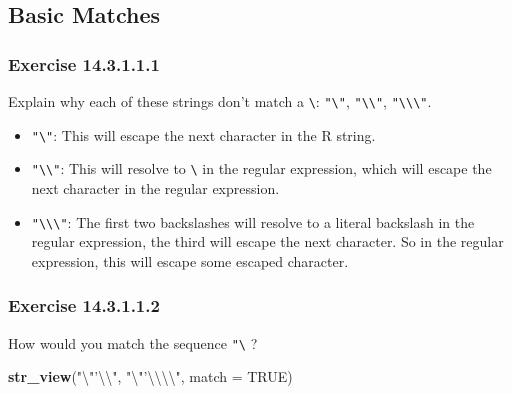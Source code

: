 \documentclass[]{book}
\newenvironment{Shaded}{\begin{snugshade}}{\end{snugshade}}
\newcommand{\CharTok}[1]{\textcolor[rgb]{0.31,0.60,0.02}{#1}}
\newcommand{\DataTypeTok}[1]{\textcolor[rgb]{0.13,0.29,0.53}{#1}}
\newcommand{\KeywordTok}[1]{\textcolor[rgb]{0.13,0.29,0.53}{\textbf{#1}}}
\newcommand{\NormalTok}[1]{#1}
\newcommand{\OtherTok}[1]{\textcolor[rgb]{0.56,0.35,0.01}{#1}}
\newcommand{\StringTok}[1]{\textcolor[rgb]{0.31,0.60,0.02}{#1}}
\providecommand{\tightlist}{%
  \setlength{\itemsep}{0pt}\setlength{\parskip}{0pt}}
\theoremstyle{plain}
\theoremstyle{remark}
\begin{document}
\hypertarget{basic-matches}{%
\subsection{Basic Matches}\label{basic-matches}}

\hypertarget{exercise-14.3.1.1.1}{%
\subsubsection*{\texorpdfstring{Exercise {14.3.1.1.1}}{Exercise 14.3.1.1.1}}\label{exercise-14.3.1.1.1}}

Explain why each of these strings don't match a \texttt{\textbackslash{}}: \texttt{"\textbackslash{}"}, \texttt{"\textbackslash{}\textbackslash{}"}, \texttt{"\textbackslash{}\textbackslash{}\textbackslash{}"}.

\begin{itemize}
\tightlist
\item
  \texttt{"\textbackslash{}"}: This will escape the next character in the R string.
\item
  \texttt{"\textbackslash{}\textbackslash{}"}: This will resolve to \texttt{\textbackslash{}} in the regular expression, which will escape the next character in the regular expression.
\item
  \texttt{"\textbackslash{}\textbackslash{}\textbackslash{}"}: The first two backslashes will resolve to a literal backslash in the regular expression, the third will escape the next character. So in the regular expression, this will escape some escaped character.
\end{itemize}

\hypertarget{exercise-14.3.1.1.2}{%
\subsubsection*{\texorpdfstring{Exercise {14.3.1.1.2}}{Exercise 14.3.1.1.2}}\label{exercise-14.3.1.1.2}}

How would you match the sequence \texttt{"\textquotesingle{}\textbackslash{}} ?

\begin{Shaded}
\begin{Highlighting}[]
\KeywordTok{str_view}\NormalTok{(}\StringTok{"}\CharTok{\textbackslash{}"}\StringTok{'}\CharTok{\textbackslash{}\textbackslash{}}\StringTok{"}\NormalTok{, }\StringTok{"}\CharTok{\textbackslash{}"}\StringTok{'}\CharTok{\textbackslash{}\textbackslash{}\textbackslash{}\textbackslash{}}\StringTok{"}\NormalTok{, }\DataTypeTok{match =} \OtherTok{TRUE}\NormalTok{)}
\end{Highlighting}
\end{Shaded}
\end{document}
